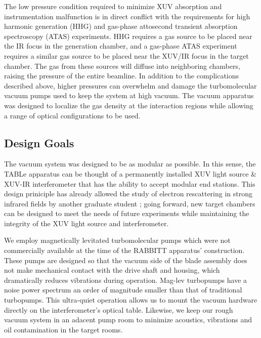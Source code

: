 The low pressure condition required to minimize XUV absorption and instrumentation malfunction is in direct conflict with the requirements for high harmonic generation (HHG) and gas-phase attosecond transient absorption spectroscopy (ATAS) experiments. HHG requires a gas source to be placed near the IR focus in the generation chamber, and a gas-phase ATAS experiment requires a similar gas source to be placed near the XUV/IR focus in the target chamber. The gas from these sources will diffuse into neighboring chambers, raising the pressure of the entire beamline. In addition to the complications described above, higher pressures can overwhelm and damage the turbomolecular vacuum pumps used to keep the system at high vacuum. The vacuum apparatus was designed to localize the gas density at the interaction regions while allowing a range of optical configurations to be used.

\subsection{Design Goals}

The vacuum system was designed to be as modular as possible. In this sense, the TABLe apparatus can be thought of a permanently installed XUV light source \& XUV-IR interferometer that has the ability to accept modular end stations. This design priniciple has already allowed the study of electron rescattering in strong infrared fields by another graduate student \cite{kiesewetterDynamicsNearThresholdAttosecond2019}; going forward, new target chambers can be designed to meet the needs of future experiments while maintaining the integrity of the XUV light source and interferometer.

We employ magnetically levitated turbomolecular pumps which were not commercially available at the time of the RABBITT apparatus' construction. These pumps are designed so that the vacuum side of the blade assembly does not make mechanical contact with the drive shaft and housing, which dramatically reduces vibrations during operation. Mag-lev turbopumps have a noise power spectrum an order of magnitude smaller than that of traditional turbopumps. This ultra-quiet operation allows us to mount the vacuum hardware directly on the interferometer's optical table. Likewise, we keep our rough vacuum system in an adacent pump room to minimize acoustics, vibrations and oil contamination in the target rooms.

